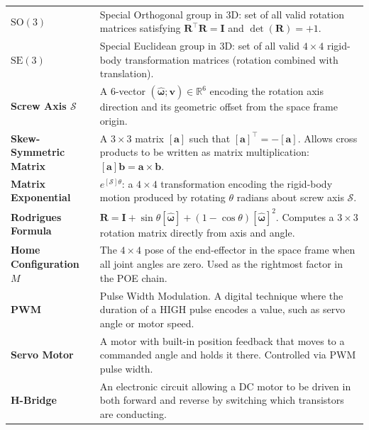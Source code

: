 \documentclass[12pt,a4paper]{article}
\newcommand{\vect}[1]{\bm{#1}}
\newcommand{\mat}[1]{\mathbf{#1}}
\begin{document}
\begin{longtable}{L{3.5cm} L{10cm}}
\textbf{$\mathrm{SO}(3)$} &
  Special Orthogonal group in 3D: set of all valid rotation matrices satisfying
  $\mat{R}^\top\mat{R}=\mat{I}$ and $\det(\mat{R})=+1$. \\[4pt]

\textbf{$\mathrm{SE}(3)$} &
  Special Euclidean group in 3D: set of all valid $4\times4$ rigid-body
  transformation matrices (rotation combined with translation). \\[4pt]

\textbf{Screw Axis $\mathcal{S}$} &
  A 6-vector $(\vect{\hat\omega};\vect{v})\in\mathbb{R}^6$ encoding the
  rotation axis direction and its geometric offset from the space frame
  origin. \\[4pt]

\textbf{Skew-Symmetric Matrix} &
  A $3\times3$ matrix $[\vect{a}]$ such that $[\vect{a}]^\top=-[\vect{a}]$.
  Allows cross products to be written as matrix multiplication:
  $[\vect{a}]\vect{b}=\vect{a}\times\vect{b}$. \\[4pt]

\textbf{Matrix Exponential} &
  $e^{[\mathcal{S}]\theta}$: a $4\times4$ transformation encoding the rigid-body
  motion produced by rotating $\theta$ radians about screw axis $\mathcal{S}$. \\[4pt]

\textbf{Rodrigues Formula} &
  $\mat{R}=\mat{I}+\sin\theta[\vect{\hat\omega}]+(1-\cos\theta)[\vect{\hat\omega}]^2$.
  Computes a $3\times3$ rotation matrix directly from axis and angle. \\[4pt]

\textbf{Home Configuration $M$} &
  The $4\times4$ pose of the end-effector in the space frame when all joint
  angles are zero. Used as the rightmost factor in the POE chain. \\[4pt]

\textbf{PWM} &
  Pulse Width Modulation. A digital technique where the duration of a HIGH pulse
  encodes a value, such as servo angle or motor speed. \\[4pt]

\textbf{Servo Motor} &
  A motor with built-in position feedback that moves to a commanded angle and
  holds it there. Controlled via PWM pulse width. \\[4pt]

\textbf{H-Bridge} &
  An electronic circuit allowing a DC motor to be driven in both forward and
  reverse by switching which transistors are conducting. \\[4pt]


\end{longtable}
\end{document}

